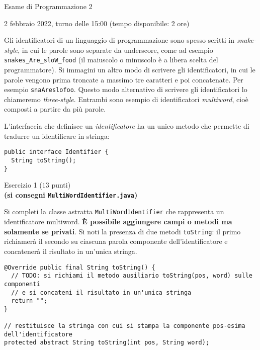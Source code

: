\documentclass[12pt]{article}
\begin{document}
\begin{center}{\LARGE Esame di Programmazione 2}\\
\begin{center}
  \large 2 febbraio 2022, turno delle 15:00 (tempo disponibile: 2 ore)
\end{center}
\end{center}

Gli identificatori di un linguaggio di programmazione sono spesso scritti
in \emph{snake-style}, in cui le parole sono separate da
underscore, come ad esempio \texttt{snakes\_Are\_sloW\_food}
(il maiuscolo o minuscolo \`e a libera scelta del programmatore).
Si immagini un altro modo di scrivere gli identificatori, in cui le parole
vengono prima troncate a massimo tre caratteri e poi concatenate.
Per esempio \texttt{snaAreslofoo}. Questo modo alternativo di scrivere
gli identificatori lo chiameremo \emph{three-style}.
Entrambi sono esempio di identificatori \emph{multiword}, cio\`e composti
a partire da pi\`u parole.

L'interfaccia che definisce un \emph{identificatore} ha un unico metodo che
permette di tradurre un identificare in stringa:

{\small\begin{verbatim}
public interface Identifier {
  String toString();
}
\end{verbatim}}

\vspace*{1ex}
\begin{center}{\Large Esercizio 1} ($13$ punti)\\
  \textbf{(si consegni \texttt{MultiWordIdentifier.java})}
\end{center}

Si completi la classe astratta \texttt{MultiWordIdentifier} che rappresenta
un identificatore multiword.
\textbf{\`E possibile aggiungere campi o metodi ma solamente se privati}.
Si noti la presenza di due metodi \texttt{toString}:
il primo richiamer\`a il secondo su ciascuna parola componente dell'identificatore
e concatener\`a il risultato in un'unica stringa.

{\small\begin{verbatim}
@Override public final String toString() {
  // TODO: si richiami il metodo ausiliario toString(pos, word) sulle componenti
  // e si concateni il risultato in un'unica stringa
  return "";
}

// restituisce la stringa con cui si stampa la componente pos-esima dell'identificatore
protected abstract String toString(int pos, String word);
\end{verbatim}}
\end{document}
